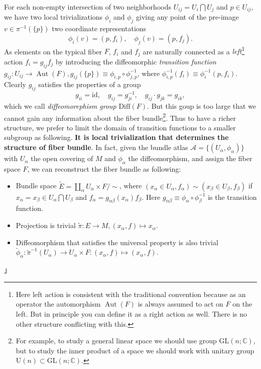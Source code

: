 \documentclass[10pt,nofootinbib,letterpaper]{revtex4}
\newenvironment{Note}{{\par~{\normalfont\bfseries Note.~「}}}{\hfill 」\par} %
\begin{document}
		For each non-empty intersection of two neighborhoods $U_{ij}=U_i\bigcap U_j$ and $p\in U_{ij}$, we have two local trivializations $\phi_i$ and $\phi_j$ giving any point of the pre-image $v\in\pi^{-1}(\{p\})$ two coordinate representations
		\begin{equation*}
			\phi_i(v)=(p,f_i),\quad \phi_j(v)=(p,f_j).
		\end{equation*}
		As elements on the typical fiber $F$, $f_i$ and $f_j$ are naturally connected as a {\color{red}\emph{left}\footnote{Here left action is consistent with the traditional convention because as an operator the automorphism $\mathop{\mathrm{Aut}}(F)$ is always assumed to act on $F$ on the left. But in principle you can define it as a right action as well. There is no other structure conflicting with this.} action $f_i=g_{ij} f_j$} by introducing the diffeomorphic \emph{transition function} $g_{ij}:U_{ij}\rightarrow\mathop{\mathrm{Aut}}(F), g_{ij}(\{p\})\equiv\phi_{i,p}\circ\phi_{j,p}^{-1}$, where $\phi_{i,p}^{-1}(f_{i})\equiv\phi_{i}^{-1}(p,f_{i})$. Clearly $g_{ij}$ satisfies the properties of a group
		\begin{equation*}
			g_{ii}=\mathrm{id},\quad g_{ij}=g_{ji}^{-1},\quad g_{ij}\cdot g_{jk}=g_{ik},
		\end{equation*}
		which we call \emph{diffeomorephism group} $\mathrm{Diff}(F)$. But this goup is too large that we cannot gain any information about the fiber bundle\footnote{For example, to study a general linear space we should use group $\mathrm{GL}(n;\mathbb{C})$, but to study the inner product of a space we should work with unitary group $\mathrm{U}(n)\subset\mathrm{GL}(n;\mathbb{C})$.}. Thus to have a richer structure, we prefer to limit the domain of transition functions to a smaller subgroup as following.
		\begin{Note}
			\textbf{It is local trivialization that determines the structure of fiber bundle}. In fact, given the bundle atlas $\mathcal{A}=\{(U_\alpha,\phi_\alpha)\}$ with $U_\alpha$ the open covering of $M$ and $\phi_\alpha$ the diffeomorphism, and assign the fiber space $F$, we can reconstruct the fiber bundle as following:
			\begin{itemize}
				\item Bundle space $\widetilde{E}=\displaystyle\coprod_\alpha U_\alpha\times F/\sim$, where $(x_\alpha\in U_\alpha,f_\alpha)\sim(x_\beta\in U_\beta,f_\beta)$ if $x_\alpha=x_\beta\in U_\alpha\bigcap U_\beta$ and $f_\alpha=g_{\alpha\beta}(x_\alpha)f_\beta$. Here $g_{\alpha\beta}\equiv\phi_\alpha\circ\phi_\beta^{-1}$ is the transition function.
				\item Projection is trivial $\widetilde{\pi}:E\rightarrow M, (x_\alpha,f)\mapsto x_\alpha$.
				\item Diffeomorphism that satisfies the universal property is also trivial $\widetilde{\phi}_\alpha:\widetilde{\pi}^{-1}(U_\alpha)\rightarrow U_\alpha\times F: (x_\alpha,f)\mapsto (x_\alpha,f)$.
			\end{itemize}
		\end{Note}
\end{document}
